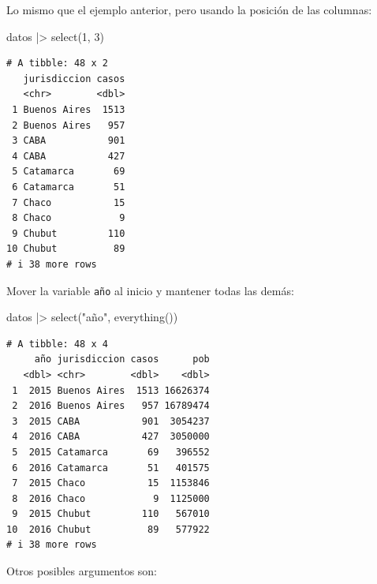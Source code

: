 \documentclass[
  spanish,
  letterpaper,
  DIV=11,
  numbers=noendperiod]{scrreprt}
\newenvironment{Shaded}{\begin{snugshade}}{\end{snugshade}}
\newcommand{\DecValTok}[1]{\textcolor[rgb]{0.68,0.00,0.00}{#1}}
\newcommand{\FunctionTok}[1]{\textcolor[rgb]{0.28,0.35,0.67}{#1}}
\newcommand{\NormalTok}[1]{\textcolor[rgb]{0.00,0.23,0.31}{#1}}
\newcommand{\SpecialCharTok}[1]{\textcolor[rgb]{0.37,0.37,0.37}{#1}}
\newcommand{\StringTok}[1]{\textcolor[rgb]{0.13,0.47,0.30}{#1}}
\begin{document}
Lo mismo que el ejemplo anterior, pero usando la posición de las
columnas:

\begin{Shaded}
\begin{Highlighting}[]
\NormalTok{datos }\SpecialCharTok{|\textgreater{}}
  \FunctionTok{select}\NormalTok{(}\DecValTok{1}\NormalTok{, }\DecValTok{3}\NormalTok{)}
\end{Highlighting}
\end{Shaded}

\begin{verbatim}
# A tibble: 48 x 2
   jurisdiccion casos
   <chr>        <dbl>
 1 Buenos Aires  1513
 2 Buenos Aires   957
 3 CABA           901
 4 CABA           427
 5 Catamarca       69
 6 Catamarca       51
 7 Chaco           15
 8 Chaco            9
 9 Chubut         110
10 Chubut          89
# i 38 more rows
\end{verbatim}

Mover la variable \texttt{año} al inicio y mantener todas las demás:

\begin{Shaded}
\begin{Highlighting}[]
\NormalTok{datos }\SpecialCharTok{|\textgreater{}}
  \FunctionTok{select}\NormalTok{(}\StringTok{"año"}\NormalTok{, }\FunctionTok{everything}\NormalTok{())}
\end{Highlighting}
\end{Shaded}

\begin{verbatim}
# A tibble: 48 x 4
     año jurisdiccion casos      pob
   <dbl> <chr>        <dbl>    <dbl>
 1  2015 Buenos Aires  1513 16626374
 2  2016 Buenos Aires   957 16789474
 3  2015 CABA           901  3054237
 4  2016 CABA           427  3050000
 5  2015 Catamarca       69   396552
 6  2016 Catamarca       51   401575
 7  2015 Chaco           15  1153846
 8  2016 Chaco            9  1125000
 9  2015 Chubut         110   567010
10  2016 Chubut          89   577922
# i 38 more rows
\end{verbatim}

Otros posibles argumentos son:
\end{document}

